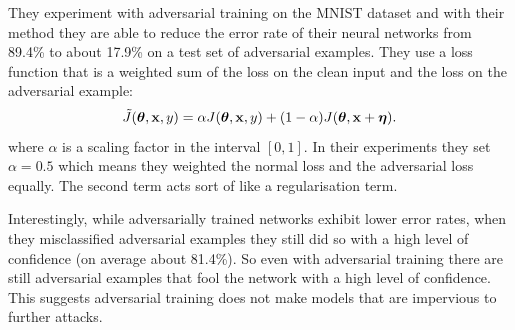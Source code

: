 \documentclass{article}
\begin{document}
They experiment with adversarial training on the MNIST dataset and with their method they are able to reduce the error rate of their neural networks from 89.4\% to about 17.9\% on a test set of adversarial examples.
They use a loss function that is a weighted sum of the loss on the clean input and the loss on the adversarial example:
\begin{equation*}
    \Tilde{J}(\boldsymbol{\theta}, \mathbf{x}, y) = \alpha J(\boldsymbol{\theta}, \mathbf{x}, y) + (1 - \alpha)J(\boldsymbol{\theta}, \mathbf{x} + \boldsymbol{\eta}).
\end{equation*}
where $\alpha$ is a scaling factor in the interval $[0, 1]$. In their experiments they set $\alpha=0.5$ which means they weighted the normal loss and the adversarial loss equally.
The second term acts sort of like a regularisation term.

Interestingly, while adversarially trained networks exhibit lower error rates, when they misclassified adversarial examples they still did so with a high level of confidence (on average about 81.4\%). So even with adversarial training there are still adversarial examples that fool the network with a high level of confidence. This suggests adversarial training does not make models that are impervious to further attacks. 
\end{document}
